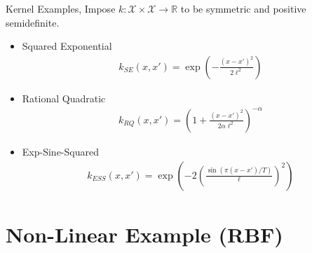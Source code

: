 \documentclass[10pt]{beamer}
\begin{document}
\begin{frame}{Kernel Examples}{\cite{ROERGA}, \cite[Chapter 4.2]{RW05}}
Impose $k:\mathcal{X}\times\mathcal{X}\longrightarrow \mathbb{R}$ to be symmetric and positive semidefinite. 
\begin{itemize}
\item Squared Exponential 
\begin{align*}
k_{SE}(x, x') = \exp\left(- \frac{(x - x')^2}{2\ell ^2}\right)
\end{align*}
\item Rational Quadratic 
\begin{align*}
k_{RQ}(x, x') = \left(1 + \frac{(x - x')^2}{2\alpha\ell^2}\right)^{-\alpha}
\end{align*}
\item Exp-Sine-Squared 
\begin{align*}
k_{ESS} (x, x')= \exp\left(-2 \left(\frac{\sin(\pi (x - x')/T )}{\ell}\right)^2\right)
\end{align*}
\end{itemize}
\end{frame}

\section{Non-Linear Example (RBF)}
\end{document}
